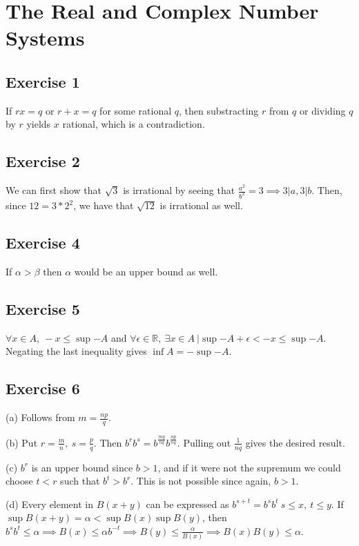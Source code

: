 \section{The Real and Complex Number Systems}

\subsection{Exercise 1}
If $rx = q$ or $r+x = q$ for some rational $q$, then substracting $r$ from $q$ or dividing $q$ by $r$ 
yields $x$ rational, which is a contradiction.

\subsection{Exercise 2}
We can first show that $\sqrt{3}$ is irrational by seeing that $\frac{a^2}{b^2} = 3 \implies 3 | a, 3 | b$.
Then, since $12 = 3 * 2^2$, we have that $\sqrt{12}$ is irrational as well.

\subsection{Exercise 4}
If $\alpha > \beta$ then $\alpha$ would be an upper bound as well.

\subsection{Exercise 5}
$\forall x \in A, \: -x \leq \sup{-A}$ and $\forall \epsilon \in \mathbb{R}, \: \exists x \in A \: | \sup{-A} + \epsilon < -x \leq \sup{-A}$. Negating the last inequality gives $\inf{A} = -\sup{-A}$.

\subsection{Exercise 6}
(a) Follows from $m = \frac{np}{q}$.

(b) Put $r = \frac{m}{n}, \: s = \frac{p}{q}$. Then $b^r b^s = b^{\frac{mq}{nq}} b^{\frac{np}{nq}}$.
Pulling out $\frac{1}{nq}$ gives the desired result.

(c) $b^r$ is an upper bound since $b > 1$, and if it were not the supremum we could choose 
$t < r$ such that $b^t > b^r$. This is not possible since again, $b > 1$.

(d) Every element in $B(x + y)$ can be expressed as $b^{s + t} = b^s b^t \: s \leq x, \: t \leq y$.
If $\sup{B(x+y)} = \alpha < \sup{B(x)}\sup{B(y)}$, then $b^s b^t \leq \alpha \implies B(x) \leq \alpha b^{-t}
\implies B(y) \leq \frac{\alpha}{B(x)} \implies B(x) B(y) \leq \alpha$.

